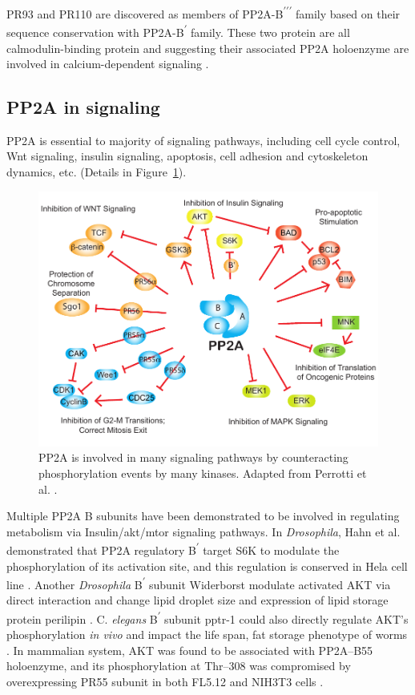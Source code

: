 PR93 and PR110 are discovered as members of PP2A-B\textsuperscript{$\prime\prime\prime$} family based on their sequence conservation with PP2A-B\textsuperscript{$\prime$} family. These two protein are all calmodulin-binding protein and suggesting their associated PP2A holoenzyme are involved in calcium-dependent signaling \cite{moreno_wd40_2000}.

\subsection{PP2A in signaling}

PP2A is essential to majority of signaling pathways, including cell cycle control, Wnt signaling, insulin signaling, apoptosis, cell adhesion and cytoskeleton dynamics, etc. (Details in Figure~\ref{fig:fig1.1}).

\begin{figure}[!ht]
\centering
\includegraphics[width=1\textwidth]{figs/fig1-1 pp2a signaling.pdf}
\caption[PP2A in signaling]{\footnotesize PP2A is involved in many signaling pathways by counteracting phosphorylation events by many kinases. Adapted from Perrotti et al. \cite{perrotti_protein_2013}.}
\label{fig:fig1.1}
\end{figure}

Multiple PP2A B subunits have been demonstrated to be involved in regulating metabolism via Insulin/\gls{akt}/\gls{mtor} signaling pathways. In \textit{Drosophila}, Hahn et al. demonstrated that PP2A regulatory B\textsuperscript{$\prime$} target S6K to modulate the phosphorylation of its activation site, and this regulation is conserved in Hela cell line \cite{hahn_pp2a_2010}. Another \textit{Drosophila} B\textsuperscript{$\prime$} subunit Widerborst modulate activated AKT via direct interaction and change lipid droplet size and expression of lipid storage protein perilipin \cite{vereshchagina_protein_2008}. C. \textit{elegans} B\textsuperscript{$\prime$} subunit pptr-1 could also directly regulate AKT's phosphorylation \textit{in vivo} and impact the life span, fat storage phenotype of worms \cite{padmanabhan_pp2a_2009}. In mammalian system, AKT was found to be associated with PP2A--B55 holoenzyme, and its phosphorylation at Thr--308 was compromised by overexpressing PR55\textalpha{} subunit in both FL5.12 and NIH3T3 cells \cite{kuo_regulation_2008}.

